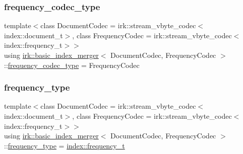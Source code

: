 \subsubsection{\texorpdfstring{frequency\+\_\+codec\+\_\+type}{frequency\_codec\_type}}
{\footnotesize\ttfamily template$<$class Document\+Codec  = irk\+::stream\+\_\+vbyte\+\_\+codec$<$index\+::document\+\_\+t$>$, class Frequency\+Codec  = irk\+::stream\+\_\+vbyte\+\_\+codec$<$index\+::frequency\+\_\+t$>$$>$ \\
using \mbox{\hyperlink{classirk_1_1basic__index__merger}{irk\+::basic\+\_\+index\+\_\+merger}}$<$ Document\+Codec, Frequency\+Codec $>$\+::\mbox{\hyperlink{classirk_1_1basic__index__merger_aafab06bb9812cd99b8cf1ed9ac575074}{frequency\+\_\+codec\+\_\+type}} =  Frequency\+Codec}

\mbox{\label{classirk_1_1basic__index__merger_add1c7a6efe038b37d14899012dadf01a}} 
\subsubsection{\texorpdfstring{frequency\+\_\+type}{frequency\_type}}
{\footnotesize\ttfamily template$<$class Document\+Codec  = irk\+::stream\+\_\+vbyte\+\_\+codec$<$index\+::document\+\_\+t$>$, class Frequency\+Codec  = irk\+::stream\+\_\+vbyte\+\_\+codec$<$index\+::frequency\+\_\+t$>$$>$ \\
using \mbox{\hyperlink{classirk_1_1basic__index__merger}{irk\+::basic\+\_\+index\+\_\+merger}}$<$ Document\+Codec, Frequency\+Codec $>$\+::\mbox{\hyperlink{classirk_1_1basic__index__merger_add1c7a6efe038b37d14899012dadf01a}{frequency\+\_\+type}} =  \mbox{\hyperlink{namespaceirk_1_1index_aa2cb48e79abd95deb25bbdf36c0ea70f}{index\+::frequency\+\_\+t}}}

\mbox{\label{classirk_1_1basic__index__merger_a76f8b8ca41e8fa63480a0d2421578259}} 
